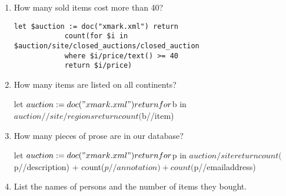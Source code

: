 \begin{enumerate}[label=Q\arabic*.]
		\item %
			How many sold items cost more than 40?		
		\begin{lstlisting}[style=XQuery]
			let $auction := doc("xmark.xml") return
			count(for $i in $auction/site/closed_auctions/closed_auction
			where $i/price/text() >= 40
			return $i/price)
		\end{lstlisting}	
		\item %
			How many items are listed on all continents?
		\begin{fakeXML}
			let $auction := doc("xmark.xml") return
			for $b in $auction//site/regions
			return count($b//item)
		\end{fakeXML}	
		\item %
			How many pieces of prose are in our database?
		\begin{fakeXML}
			let $auction := doc("xmark.xml") return
			for $p in $auction/site
			return count($p//description) + count($p//annotation) + count($p//emailaddress)
		\end{fakeXML}	
		\item %
			List the names of persons and the number of items they bought.
			

\end{enumerate}
